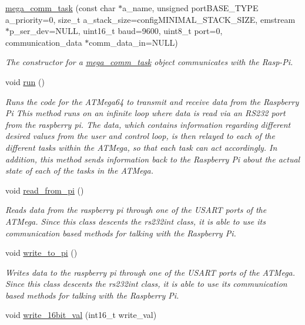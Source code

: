 \begin{DoxyCompactItemize}
\item 
\hyperlink{classmega__comm__task_a1a3a2dc1e6d669bebba0970711075667}{mega\+\_\+comm\+\_\+task} (const char $\ast$a\+\_\+name, unsigned port\+B\+A\+S\+E\+\_\+\+T\+Y\+PE a\+\_\+priority=0, size\+\_\+t a\+\_\+stack\+\_\+size=config\+M\+I\+N\+I\+M\+A\+L\+\_\+\+S\+T\+A\+C\+K\+\_\+\+S\+I\+ZE, emstream $\ast$p\+\_\+ser\+\_\+dev=N\+U\+LL, uint16\+\_\+t baud=9600, uint8\+\_\+t port=0, communication\+\_\+data $\ast$comm\+\_\+data\+\_\+in=N\+U\+LL)
\begin{DoxyCompactList}\small\item\em The constructor for a \hyperlink{classmega__comm__task}{mega\+\_\+comm\+\_\+task} object communicates with the Rasp-\/\+Pi. \end{DoxyCompactList}\item 
void \hyperlink{classmega__comm__task_a138a230db5d3c9362b977e4777af6165}{run} ()
\begin{DoxyCompactList}\small\item\em Runs the code for the A\+T\+Mega64 to transmit and receive data from the Raspberry Pi This method runs on an infinite loop where data is read via an R\+S232 port from the raspberry pi. The data, which contains information regarding different desired values from the user and control loop, is then relayed to each of the different tasks within the A\+T\+Mega, so that each task can act accordingly. In addition, this method sends information back to the Raspberry Pi about the actual state of each of the tasks in the A\+T\+Mega. \end{DoxyCompactList}\item 
void \hyperlink{classmega__comm__task_abb741c63ba06af3870a26889f4f4f4e6}{read\+\_\+from\+\_\+pi} ()
\begin{DoxyCompactList}\small\item\em Reads data from the raspberry pi through one of the U\+S\+A\+RT ports of the A\+T\+Mega. Since this class descents the rs232int class, it is able to use its communication based methods for talking with the Raspberry Pi. \end{DoxyCompactList}\item 
void \hyperlink{classmega__comm__task_abf150bee11df6ad351ebc06328a87155}{write\+\_\+to\+\_\+pi} ()
\begin{DoxyCompactList}\small\item\em Writes data to the raspberry pi through one of the U\+S\+A\+RT ports of the A\+T\+Mega. Since this class descents the rs232int class, it is able to use its communication based methods for talking with the Raspberry Pi. \end{DoxyCompactList}\item 
void \hyperlink{classmega__comm__task_a63bc85730a7b93c3240502979cd1c3b9}{write\+\_\+16bit\+\_\+val} (int16\+\_\+t write\+\_\+val)\hypertarget{classmega__comm__task_a63bc85730a7b93c3240502979cd1c3b9}{}\label{classmega__comm__task_a63bc85730a7b93c3240502979cd1c3b9}


\end{DoxyCompactItemize}
